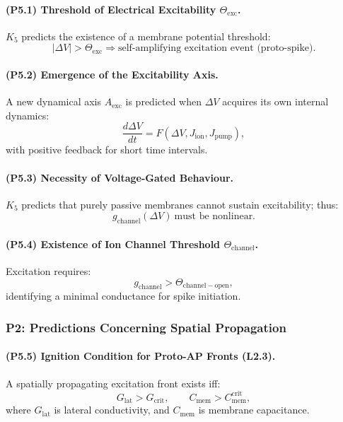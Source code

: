 \paragraph{(P5.1) Threshold of Electrical Excitability $\Theta_{\mathrm{exc}}$.}
$K_5$ predicts the existence of a membrane potential threshold:
\[
|\Delta V| > \Theta_{\mathrm{exc}}
\Rightarrow \text{self-amplifying excitation event (proto-spike)}.
\]

\paragraph{(P5.2) Emergence of the Excitability Axis.}
A new dynamical axis $A_{\mathrm{exc}}$ is predicted when $\Delta V$ acquires
its own internal dynamics:
\[
\frac{d \Delta V}{dt} = F(\Delta V, J_{\mathrm{ion}},J_{\mathrm{pump}}),
\]
with positive feedback for short time intervals.

\paragraph{(P5.3) Necessity of Voltage-Gated Behaviour.}
$K_5$ predicts that purely passive membranes cannot sustain excitability; thus:
\[
g_{\mathrm{channel}}(\Delta V) \ \text{must be nonlinear.}
\]

\paragraph{(P5.4) Existence of Ion Channel Threshold $\Theta_{\mathrm{channel}}$.}
Excitation requires:
\[
g_{\mathrm{channel}} > \Theta_{\mathrm{channel-open}},
\]
identifying a minimal conductance for spike initiation.

\subsubsection{P2: Predictions Concerning Spatial Propagation}

\paragraph{(P5.5) Ignition Condition for Proto-AP Fronts (L2.3).}
A spatially propagating excitation front exists iff:
\[
G_{\mathrm{lat}} > G_{\mathrm{crit}},
\qquad
C_{\mathrm{mem}} > C_{\mathrm{mem}}^{\mathrm{crit}},
\]
where $G_{\mathrm{lat}}$ is lateral conductivity, and $C_{\mathrm{mem}}$ is
membrane capacitance.

